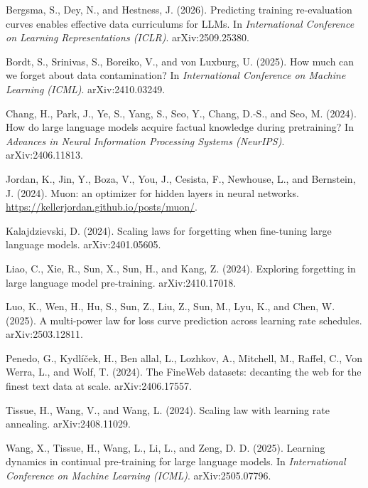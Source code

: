 \documentclass{article}
\begin{document}
{\raggedright
\begin{list}{}{\setlength{\leftmargin}{1em}\setlength{\itemindent}{-1em}\setlength{\itemsep}{3pt}\setlength{\parsep}{0pt}\setlength{\topsep}{2pt}}
\item Bergsma, S., Dey, N., and Hestness, J. (2026). Predicting training re-evaluation curves enables effective data curriculums for LLMs. In \textit{International Conference on Learning Representations (ICLR)}. arXiv:2509.25380.
\item Bordt, S., Srinivas, S., Boreiko, V., and von Luxburg, U. (2025). How much can we forget about data contamination? In \textit{International Conference on Machine Learning (ICML)}. arXiv:2410.03249.
\item Chang, H., Park, J., Ye, S., Yang, S., Seo, Y., Chang, D.-S., and Seo, M. (2024). How do large language models acquire factual knowledge during pretraining? In \textit{Advances in Neural Information Processing Systems (NeurIPS)}. arXiv:2406.11813.
\item Jordan, K., Jin, Y., Boza, V., You, J., Cesista, F., Newhouse, L., and Bernstein, J. (2024). Muon: an optimizer for hidden layers in neural networks. \url{https://kellerjordan.github.io/posts/muon/}.
\item Kalajdzievski, D. (2024). Scaling laws for forgetting when fine-tuning large language models. arXiv:2401.05605.
\item Liao, C., Xie, R., Sun, X., Sun, H., and Kang, Z. (2024). Exploring forgetting in large language model pre-training. arXiv:2410.17018.
\item Luo, K., Wen, H., Hu, S., Sun, Z., Liu, Z., Sun, M., Lyu, K., and Chen, W. (2025). A multi-power law for loss curve prediction across learning rate schedules. arXiv:2503.12811.
\item Penedo, G., Kydl\'i\v{c}ek, H., Ben allal, L., Lozhkov, A., Mitchell, M., Raffel, C., Von Werra, L., and Wolf, T. (2024). The FineWeb datasets: decanting the web for the finest text data at scale. arXiv:2406.17557.
\item Tissue, H., Wang, V., and Wang, L. (2024). Scaling law with learning rate annealing. arXiv:2408.11029.
\item Wang, X., Tissue, H., Wang, L., Li, L., and Zeng, D. D. (2025). Learning dynamics in continual pre-training for large language models. In \textit{International Conference on Machine Learning (ICML)}. arXiv:2505.07796.
\end{list}}

\newpage
\appendix
\onecolumn
\raggedbottom
\end{document}
